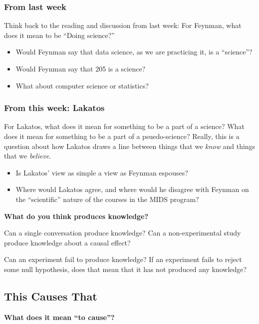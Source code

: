 \documentclass[
]{article}
\providecommand{\tightlist}{%
  \setlength{\itemsep}{0pt}\setlength{\parskip}{0pt}}
\theoremstyle{definition}
\theoremstyle{definition}
\theoremstyle{definition}
\theoremstyle{definition}
\theoremstyle{remark}
\begin{document}
\subsubsection{From last week}\label{from-last-week}

Think back to the reading and discussion from last week: For Feynman, what does it mean to be ``Doing science?''

\begin{itemize}
\tightlist
\item
  Would Feynman say that data science, as we are practicing it, is a ``science''?
\item
  Would Feynman say that 205 is a science?
\item
  What about computer science or statistics?
\end{itemize}

\subsubsection{From this week: Lakatos}\label{from-this-week-lakatos}

For Lakatos, what does it mean for something to be a part of a science? What does it mean for something to be a part of a psuedo-science? Really, this is a question about how Lakatos draws a line between things that we \emph{know} and things that we \emph{believe}.

\begin{itemize}
\tightlist
\item
  Is Lakatos' view as simple a view as Feynman espouses?
\item
  Where would Lakatos agree, and where would he disagree with Feynman on the ``scientific'' nature of the courses in the MIDS program?
\end{itemize}

\textbf{What do you think produces knowledge?}

Can a single conversation produce knowledge? Can a non-experimental study produce knowledge about a causal effect?

Can an experiment fail to produce knowledge? If an experiment fails to reject some null hypothesis, does that mean that it has not produced any knowledge?

\subsection{This Causes That}\label{this-causes-that}

\textbf{What does it mean ``to cause''?}
\end{document}
